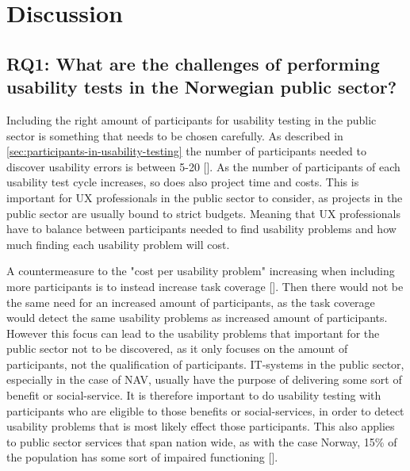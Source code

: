 \section{Discussion}

\subsection{RQ1: What are the challenges of performing usability tests in the Norwegian public sector?}
Including the right amount of participants for usability testing in the public sector is something that needs to be chosen carefully. As described in \autoref{sec:participants-in-usability-testing} the number of participants needed to discover usability errors is between 5-20 [\cite{ola_2019}]. As the number of participants of each usability test cycle increases, so does also project time and costs. This is important for UX professionals in the public sector to consider, as projects in the public sector are usually bound to strict budgets. Meaning that UX professionals have to balance between participants needed to find usability problems and how much finding each usability problem will cost.

A countermeasure to the "cost per usability problem" increasing when including more participants is to instead increase task coverage [\cite{gl_2007}]. Then there would not be the same need for an increased amount of participants, as the task coverage would detect the same usability problems as increased amount of participants. However this focus can lead to the usability problems that important for the public sector not to be discovered, as it only focuses on the amount of participants, not the qualification of participants. IT-systems in the public sector, especially in the case of NAV, usually have the purpose of delivering some sort of benefit or social-service. It is therefore important to do usability testing with participants who are eligible to those benefits or social-services, in order to detect usability problems that is most likely effect those participants. This also applies to public sector services that span nation wide, as with the case Norway, 15\% of the population has some sort of impaired functioning [\cite{nhf_2022}].

